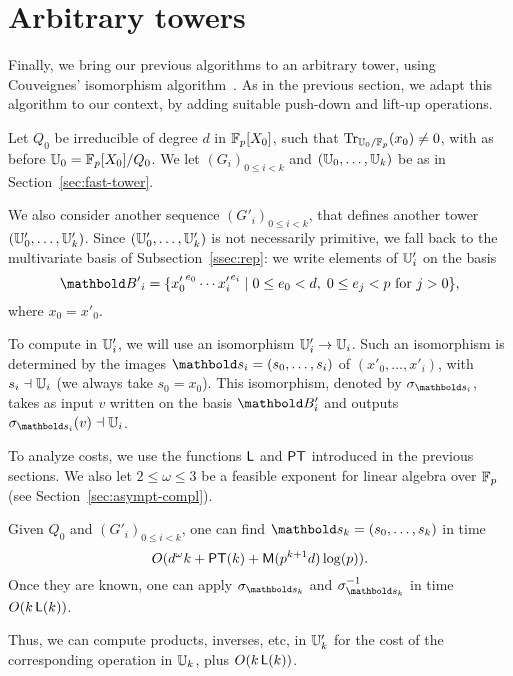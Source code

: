 \section{Arbitrary towers}
\label{sec:couveignes-algorithm}

Finally, we bring our previous algorithms to an arbitrary tower, using
Couveignes' isomorphism algorithm~\cite{couveignes00}. As in the
previous section, we adapt this algorithm to our context, by adding
suitable push-down and lift-up operations.

Let $Q_0$ be irreducible of degree $d$ in $\mathbb{F}_p[X_0]$, such that
$\operatorname{Tr}_{\mathbb{U}_0/\mathbb{F}_p}(x_0)\ne0$, with as before
$\mathbb{U}_0=\mathbb{F}_p[X_0]/Q_0$. We let $(G_i)_{0 \le i < k}$ and
$(\mathbb{U}_0,\ldots,\mathbb{U}_k)$ be as in Section~\ref{sec:fast-tower}.

We also consider another sequence $(G'_i)_{0 \le i < k}$, that defines
another tower $(\mathbb{U}'_0,\ldots,\mathbb{U}'_k)$.  Since $(\mathbb{U}'_0,\ldots,\mathbb{U}'_k)$ is
not necessarily primitive, we fall back to the multivariate basis of
Subsection~\ref{ssec:rep}: we write elements of $\mathbb{U}'_i$ on the basis
  \begin{equation}
  \basis{B'}_i=
  \{{x'_0}^{e_0} \cdots {x'_i}^{e_i} \;|\; 0 \le e_0 < d,\; 0\le e_j < p 
  \text{ for $j>0$}\}
  \text{,}
\end{equation}
where $x_0=x'_0$.

To compute in $\mathbb{U}'_i$, we will use an isomorphism $\mathbb{U}'_i \rightarrow \mathbb{U}_i$.
Such an isomorphism is determined by the images
$\lst{s}_i=(s_0,\dots,s_i)$ of $(x'_0,\dots,x'_i)$, with $s_i \dashv
\mathbb{U}_i$ (we always take $s_0=x_0$). This isomorphism, denoted by
$\sigma_{\lst{s}_i}$, takes as input $v$ written on the basis
$\basis{B}'_i$ and outputs $\sigma_{\lst{s}_i}(v)\wrt \U_i$.

To analyze costs, we use the functions $\mathsf{L}$ and $\mathsf{PT}$ introduced
in the previous sections. We also let $2 \le \omega \le 3$ be a
feasible exponent for linear algebra over $\mathbb{F}_p$ (see
Section~\ref{sec:asympt-compl}).
\begin{theorem}\label{theo:main}
  Given $Q_0$ and $(G'_i)_{0 \le i < k}$, one can find
  $\lst{s}_k=(s_0,\dots,s_k)$ in time 
  \begin{equation}
    \label{eq:105}
    O(d^\omega k + \mathsf{PT}(k) +
    \mathsf{M}(p^{k+1} d) \log(p))
    \text{.}
  \end{equation}
  Once they are known, one can apply
  $\sigma_{\lst{s}_k}$ and $\sigma_{\lst{s}_k}^{-1}$ in time $O(k\,
  \mathsf{L}(k))$.
\end{theorem}
Thus, we can compute products, inverses, etc, in $\mathbb{U}'_k$ for
the cost of the corresponding operation in $\mathbb{U}_k$, plus $O(k\,
\mathsf{L}(k))$.

